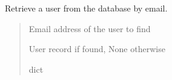 \documentclass[letterpaper,10pt,openany,oneside,english]{sphinxmanual}
\begin{document}
\begin{savenotes}\begin{fulllineitems}
\label{\detokenize{modules/security:storeapi.security.get_user}}
\pysigstartsignatures
{}
\pysigstopsignatures
\sphinxAtStartPar
Retrieve a user from the database by email.
\begin{quote}\begin{description}
\sphinxAtStartPar
{} \textendash{} Email address of the user to find

\sphinxAtStartPar
User record if found, None otherwise

\sphinxAtStartPar
dict

\end{description}\end{quote}

\end{fulllineitems}\end{savenotes}

\end{document}
